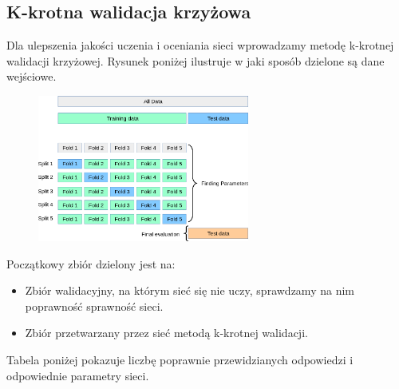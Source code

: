 \documentclass[12pt,a4paper]{article}
\begin{document}
\subsection{K-krotna walidacja krzyżowa}

Dla ulepszenia jakości uczenia i oceniania sieci wprowadzamy metodę k-krotnej walidacji krzyżowej. Rysunek poniżej ilustruje w jaki sposób dzielone są dane wejściowe.

\begin{figure}[h]
  \centering
  \includegraphics[width=0.62\textwidth]{charts/grid_search_cross_validation.png}
  \caption{}
  \label{}
\end{figure}

Początkowy zbiór dzielony jest na:

\begin{itemize}
  \item   Zbiór walidacyjny, na którym sieć się nie uczy, sprawdzamy na nim poprawność sprawność sieci.
  \item   Zbiór przetwarzany przez sieć metodą k-krotnej walidacji.
\end{itemize}

Tabela poniżej pokazuje liczbę poprawnie przewidzianych odpowiedzi i odpowiednie parametry sieci.
 
\end{document}
